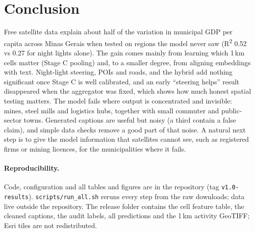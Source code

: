 \documentclass[11pt,a4paper]{article}
\newcommand{\R}{R\textsuperscript{2}}
\begin{document}
\section{Conclusion}
Free satellite data explain about half of the variation in municipal GDP per capita across Minas Gerais when tested
on regions the model never saw (\R{} 0.52 vs 0.27 for night lights alone). The gain comes mainly from learning which
1\,km cells matter (Stage C pooling) and, to a smaller degree, from aligning embeddings with text. Night-light steering,
POIs and roads, and the hybrid add nothing significant once Stage C is well calibrated, and an early ``steering
helps'' result disappeared when the aggregator was fixed, which shows how much honest spatial testing matters. The
model fails where output is concentrated and invisible: mines, steel mills and logistics hubs, together with small
commuter and public-sector towns. Generated captions are useful but noisy (a third contain a false claim), and simple
data checks remove a good part of that noise. A natural next step is to give the model information that satellites
cannot see, such as registered firms or mining licences, for the municipalities where it fails.

\paragraph{Reproducibility.} Code, configuration and all tables and figures are in the repository (tag
\texttt{v1.0-results}). \texttt{scripts/run\_all.sh} reruns every step from the raw downloads; data live outside the
repository. The release folder contains the cell feature table, the cleaned captions, the audit labels, all
predictions and the 1\,km activity GeoTIFF; Esri tiles are not redistributed.
\end{document}

